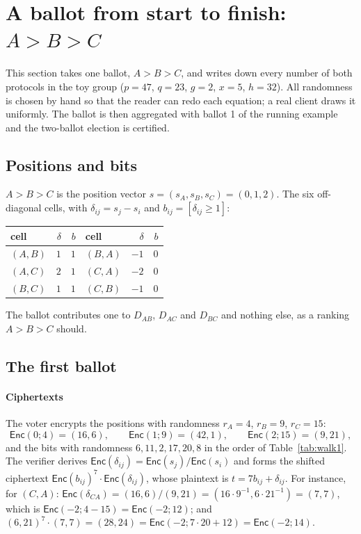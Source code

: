 \documentclass[11pt,a4paper]{article}
\newcommand{\Enc}{\mathsf{Enc}}
\theoremstyle{remark}
\begin{document}
\section{A ballot from start to finish: $A > B > C$}\label{sec:walk}
This section takes one ballot, $A > B > C$, and writes down every number
of both protocols in the toy group ($p = 47$, $q = 23$, $g = 2$, $x = 5$,
$h = 32$). All randomness is chosen by hand so that the reader can redo
each equation; a real client draws it uniformly. The ballot is then
aggregated with ballot 1 of the running example and the two-ballot
election is certified.

\subsection{Positions and bits}
$A > B > C$ is the position vector $s = (s_A, s_B, s_C) = (0, 1, 2)$. The
six off-diagonal cells, with $\delta_{ij} = s_j - s_i$ and $b_{ij} =
[\delta_{ij} \ge 1]$:
\begin{center}
\begin{tabular}{@{}lrr@{\qquad}lrr@{}}
\toprule
cell & $\delta$ & $b$ & cell & $\delta$ & $b$ \\
\midrule
$(A,B)$ & $1$ & $1$ & $(B,A)$ & $-1$ & $0$ \\
$(A,C)$ & $2$ & $1$ & $(C,A)$ & $-2$ & $0$ \\
$(B,C)$ & $1$ & $1$ & $(C,B)$ & $-1$ & $0$ \\
\bottomrule
\end{tabular}
\end{center}
The ballot contributes one to $D_{AB}$, $D_{AC}$ and $D_{BC}$ and nothing
else, as a ranking $A > B > C$ should.

\subsection{The first ballot}

\paragraph{Ciphertexts} The voter encrypts the positions with randomness
$r_A = 4$, $r_B = 9$, $r_C = 15$:
\[
  \Enc(0; 4) = (16, 6),\qquad \Enc(1; 9) = (42, 1),\qquad \Enc(2; 15) = (9, 21),
\]
and the bits with randomness $6, 11, 2, 17, 20, 8$ in the order of
Table~\ref{tab:walk1}. The verifier derives $\Enc(\delta_{ij}) =
\Enc(s_j) / \Enc(s_i)$ and forms the shifted ciphertext $\Enc(b_{ij})^7
\cdot \Enc(\delta_{ij})$, whose plaintext is $t = 7 b_{ij} + \delta_{ij}$.
For instance, for $(C, A)$: $\Enc(\delta_{CA}) = (16, 6) / (9, 21) = (16
\cdot 9^{-1}, 6 \cdot 21^{-1}) = (7, 7)$, which is $\Enc(-2; 4 - 15) =
\Enc(-2; 12)$; and $(6, 21)^7 \cdot (7, 7) = (28, 24) = \Enc(-2; 7 \cdot
20 + 12) = \Enc(-2; 14)$.
\end{document}
